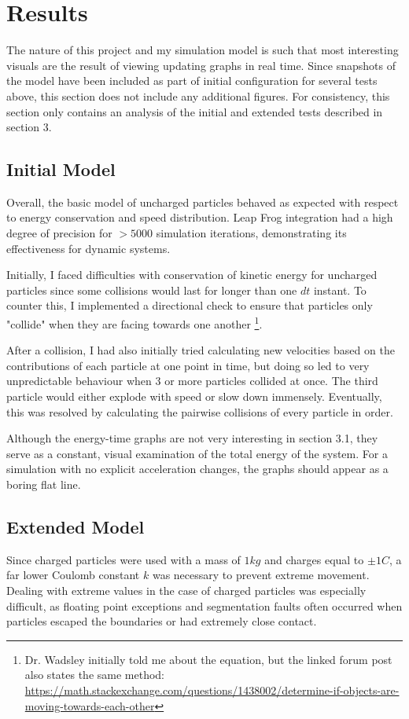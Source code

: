 \documentclass{article}
\begin{document}
\section{Results}
The nature of this project and my simulation model is such that most interesting visuals
are the result of viewing updating graphs in real time.
Since snapshots of the model have been included as part of initial configuration for several tests above,
this section does not include any additional figures.
For consistency, this section only contains an analysis of the initial and extended tests described in section 3.

\subsection{Initial Model}
Overall, the basic model of uncharged particles behaved as expected
with respect to energy conservation and speed distribution.
Leap Frog integration had a high degree of precision for $>5000$ simulation iterations,
demonstrating its effectiveness for dynamic systems.

Initially, I faced difficulties with conservation of kinetic energy for uncharged particles
since some collisions would last for longer than one $dt$ instant.
To counter this, I implemented a directional check to ensure that particles only
"collide" when they are facing towards one another
\footnote{Dr. Wadsley initially told me about the equation, but the linked forum post also states the same method:
\url{https://math.stackexchange.com/questions/1438002/determine-if-objects-are-moving-towards-each-other}}.

After a collision, I had also initially tried calculating new velocities
based on the contributions of each particle at one point in time,
but doing so led to very unpredictable behaviour when 3 or more particles collided at once.
The third particle would either explode with speed or slow down immensely.
Eventually, this was resolved by calculating the pairwise collisions of every particle in order.

Although the energy-time graphs are not very interesting in section 3.1,
they serve as a constant, visual examination of the total energy of the system.
For a simulation with no explicit acceleration changes, the graphs should appear as a boring flat line.

\subsection{Extended Model}
Since charged particles were used with a mass of $1 kg$ and charges equal to $\pm 1 C$,
a far lower Coulomb constant $k$ was necessary to prevent extreme movement.
Dealing with extreme values in the case of charged particles was especially difficult,
as floating point exceptions and segmentation faults often occurred when
particles escaped the boundaries or had extremely close contact.
\end{document}

